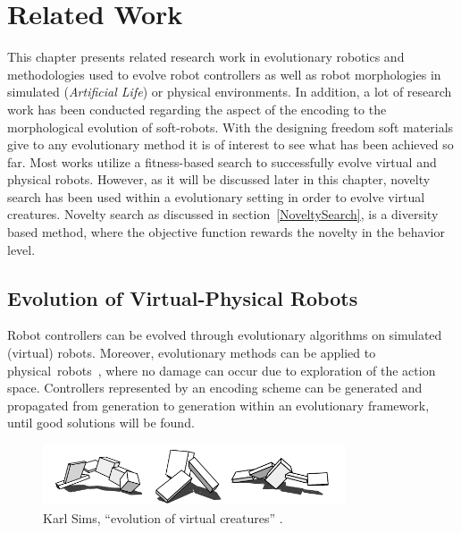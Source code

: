 
\chapter{Related Work} %

\label{Related Work} %


This chapter presents related research work in evolutionary robotics and methodologies used to evolve robot controllers as well as robot morphologies in simulated (\emph{Artificial Life}) or physical environments. In addition, a lot of research work has been conducted regarding the aspect of the encoding to the morphological evolution of soft-robots. With the designing freedom soft materials give to any evolutionary method it is of interest to see what has been achieved so far. Most works utilize a fitness-based search to successfully evolve virtual and physical robots. However, as it will be discussed later in this chapter, novelty search has been used within a evolutionary setting in order to evolve virtual creatures. Novelty search as discussed in section~\ref{NoveltySearch}, is a diversity based method, where the objective function rewards the novelty in the behavior level.


\section{Evolution of Virtual-Physical Robots}

Robot controllers can be evolved through evolutionary algorithms on simulated (virtual) robots. Moreover, evolutionary methods can be applied to physical~robots~\citep{nolfi1994evolve}, where no damage can occur due to exploration of the action space. Controllers represented by an encoding scheme can be generated and propagated from generation to generation within an evolutionary framework, until good solutions will be found.

\begin{figure}[b!]
\centering
\includegraphics[width=0.8\textwidth]{../Figures/Misc/evolvingVirtualCreatures.png}
\caption{Karl Sims, ``evolution of virtual creatures'' \citep{sims1994evolving}.}
\label{fig:karlSims}
\end{figure}

